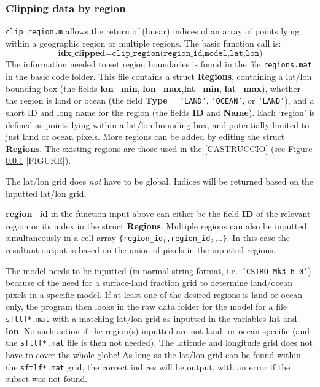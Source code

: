 \documentclass{article}
\begin{document}
\subsubsection{Clipping data by region}
\texttt{clip\_region.m} allows the return of (linear) indices of an array of points lying within a geographic region or multiple regions. The basic function call is:
\begin{equation}
\textbf{idx\_clipped} = \texttt{clip\_region(region\_id,model,lat,lon)}
\end{equation}
The information needed to set region boundaries is found in the file \texttt{regions.mat} in the basic code folder. This file contains a struct \textbf{Regions}, containing a lat/lon bounding box (the fields \textbf{lon\_min}, \textbf{lon\_max},\textbf{lat\_min}, \textbf{lat\_max}), whether the region is land or ocean (the field \textbf{Type} = \texttt{`LAND'}, \texttt{`OCEAN'}, or \texttt{`LAND'}), and a short ID and long name for the region (the fields \textbf{ID} and \textbf{Name}). Each `region' is defined as points lying within a lat/lon bounding box, and potentially limited to just land or ocean pixels. More regions can be added by editing the struct \textbf{Regions}. The existing regions are those used in the \cite{} [CASTRUCCIO] (see Figure \ref{} [FIGURE]). 

The lat/lon grid does \textit{not} have to be global. Indices will be returned based on the inputted lat/lon grid.

\textbf{region\_id} in the function input above can either be the field \textbf{ID} of the relevant region or its index in the struct \textbf{Regions}. Multiple regions can also be inputted simultaneously in a cell array \texttt{\{region\_id$_1$,region\_id$_2$,\dots\}}. In this case the resultant output is based on the union of pixels in the inputted regions.  

The model needs to be inputted (in normal string format, i.e.\ \texttt{`CSIRO-Mk3-6-0'}) because of the need for a surface-land fraction grid to determine land/ocean pixels in a specific model. If at least one of the desired regions is land or ocean only, the program then looks in the raw data folder for the model for a file \texttt{sftlf*.mat} with a matching lat/lon grid as inputted in the variables \textbf{lat} and \textbf{lon}. No such action if the region(s) inputted are not land- or ocean-specific (and the \texttt{sftlf*.mat} file is then not needed). The latitude and longitude grid does not have to cover the whole globe! As long as the lat/lon grid can be found within the \texttt{sftlf*.mat} grid, the correct indices will be output, with an error if the subset was not found. 
\end{document}
